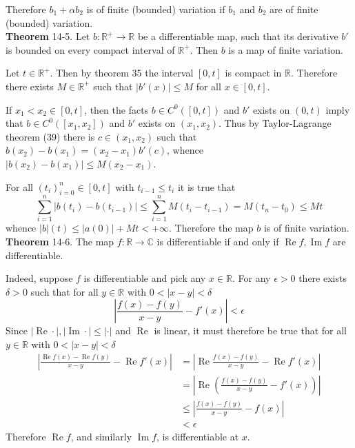 \documentclass[a4paper]{article}
\newcommand{\clo}[1]{\left [ #1 \right ]}
\newcommand{\brac}[1]{\left ( #1 \right )}
\newcommand{\abs}[1]{\left | #1 \right |}
\newcommand{\Real}{\mathbb{R}}
\newcommand{\Cplx}{\mathbb{C}}
\newcommand{\re}{\operatorname{Re}\nolimits}
\newcommand{\im}{\operatorname{Im}\nolimits}
\begin{document}
Therefore $b_1+\alpha b_2$ is of finite (bounded) variation if $b_1$ and $b_2$ are of finite (bounded) variation.\\

\label{thm:real_diff_finite_var}\noindent\textbf{Theorem} 14-5.
Let $b:\Real^+\to\Real$ be a differentiable map, such that its derivative $b'$ is bounded on every compact interval of $\Real^+$. Then $b$ is a map of finite variation.

Let $t\in \Real^+$. Then by theorem 35 the interval $\clo{0,t}$ is compact in $\Real$. Therefore there exists $M\in \Real^+$ such that $\abs{b'\brac{x}}\leq M$ for all $x\in \clo{0,t}$.

If $x_1<x_2\in \clo{0,t}$, then the facts $b\in C^0\brac{\clo{0,t}}$ and $b'$ exists on $\brac{0,t}$ imply that $b\in C^0\brac{\clo{x_1,x_2}}$ and $b'$ exists on $\brac{x_1,x_2}$. Thus by Taylor-Lagrange theorem (39) there is $c\in \brac{x_1,x_2}$ such that $b\brac{x_2}-b\brac{x_1} = \brac{x_2-x_1} b'\brac{c}$, whence $\abs{b\brac{x_2}-b\brac{x_1}}\leq M \brac{x_2-x_1}$.

For all $\brac{t_i}_{i=0}^n\in\clo{0,t}$ with $t_{i-1}\leq t_i$ it is true that \[\sum_{i=1}^n\abs{b\brac{t_i}-b\brac{t_{i-1}}}\leq \sum_{i=1}^n M\brac{t_i - t_{i-1}} = M \brac{t_n - t_0}\leq M t\] whence $\abs{b}\brac{t}\leq \abs{a\brac{0}} + M t < +\infty$. Therefore the map $b$ is of finite variation.\\

\label{thm:cplx_diff}\noindent\textbf{Theorem} 14-6.
The map $f:\Real\to\Cplx$ is differentiable if and only if $\re f,\im f$ are differentiable.

Indeed, suppose $f$ is differentiable and pick any $x\in \Real$. For any $\epsilon>0$ there exists $\delta>0$ such that for all $y\in\Real$ with $0<\abs{x-y}<\delta$ \[\abs{\frac{f\brac{x}-f\brac{y}}{x-y}-f'\brac{x}}<\epsilon\] Since $\abs{\re\cdot},\abs{\im\cdot}\leq \abs{\cdot}$ and $\re$ is linear, it must therefore be true that for all $y\in\Real$ with $0<\abs{x-y}<\delta$ \begin{align*}\abs{\frac{\re f\brac{x} - \re f\brac{y}}{x-y} - \re f'\brac{x}} &= \abs{\re\frac{f\brac{x}-f\brac{y}}{x-y} - \re f'\brac{x}}\\&= \abs{\re\brac{\frac{f\brac{x}-f\brac{y}}{x-y} - f'\brac{x}}}\\&\leq \abs{\frac{f\brac{x}-f\brac{y}}{x-y}-f\brac{x}}\\&<\epsilon\end{align*} Therefore $\re f$, and similarly $\im f$, is differentiable at $x$.
\end{document}
